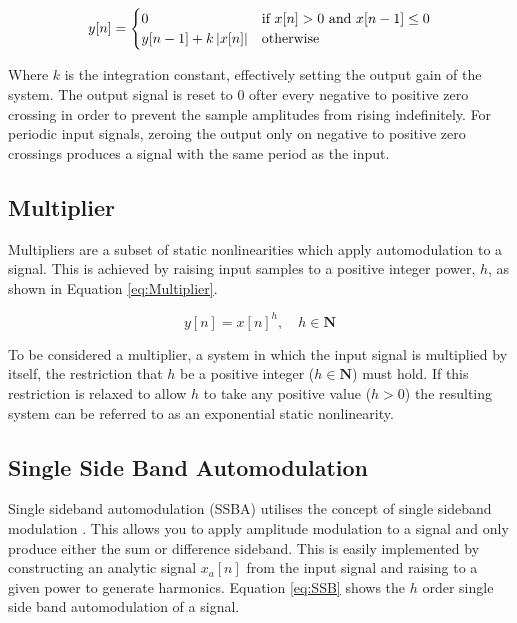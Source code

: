 		\begin{equation}
			y[n] = \begin{cases}
				0 & \text{if $x[n] > 0$ and $x[n - 1] \leq 0$} \\
				y[n - 1] + k\left|x[n]\right| & \text{otherwise}
			\end{cases}
			\label{eq:Integrator}
		\end{equation}

		Where $k$ is the integration constant, effectively setting the output gain of the system. The output signal
		is reset to 0 ofter every negative to positive zero crossing in order to prevent the sample amplitudes from
		rising indefinitely. For periodic input signals, zeroing the output only on negative to positive zero
		crossings produces a signal with the same period as the input.

	\subsection{Multiplier}
	\label{sec:Excitation-Methods-Multiplier}
		Multipliers are a subset of static nonlinearities which apply automodulation to a signal. This is achieved
		by raising input samples to a positive integer power, $h$, as shown in Equation \ref{eq:Multiplier}.

		\begin{equation}
			y[n] = x[n]^{h}, \quad h \in \textbf{N}
			\label{eq:Multiplier}
		\end{equation}

		To be considered a multiplier, a system in which the input signal is multiplied by itself, the restriction
		that $h$ be a positive integer ($h \in \textbf{N}$) must hold. If this restriction is relaxed to allow $h$
		to take any positive value ($h > 0$) the resulting system can be referred to as an exponential static
		nonlinearity.

	\subsection{Single Side Band Automodulation}
	\label{sec:Excitation-Methods-SSBA}
		Single sideband automodulation (SSBA) utilises the concept of single sideband modulation
		\citep{corinthios2009signals}. This allows you to apply amplitude modulation to a signal and only produce
		either the sum or difference sideband. This is easily implemented by constructing an analytic signal
		$x_{a}[n]$ from the input signal and raising to a given power to generate harmonics. Equation \ref{eq:SSB}
		shows the $h$ order single side band automodulation of a signal.

